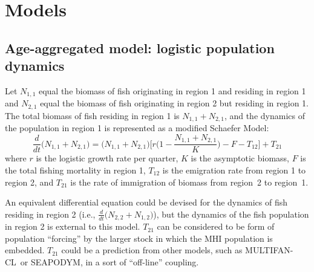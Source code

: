 \documentclass[12pt,letterpaper,twoside]{article}
\newcommand\SD{SEAPODYM}
\newcommand\MFCL{MULTIFAN-CL}
\newcommand\help[1]{\color{Magenta}{\it #1 }\normalcolor}
\newcommand\None{{N_{1,1}}}
\newcommand\Ntwo{{N_{2,1}}}
\newcommand\Nsum{{N_{1,1}+N_{2,1}}}
\begin{document}



\section{Models}
\label{sec:models}
\subsection*{Age-aggregated model: logistic population dynamics}

Let $\None$ equal the biomass of fish originating in region 1
and residing in region 1
and $\Ntwo$ equal the biomass of fish originating in region 2
but residing in region 1.
The total biomass of fish residing in region 1 is
$\Nsum$, and the dynamics of the population in region 1 is represented
as a modified Schaefer Model:
\begin{equation}
\frac{d}{dt}\big(\Nsum\big)=\big(\Nsum\big)\Big[r\Big(1-\frac{\Nsum}{K}\Big)-F-T_{12}\Big]+T_{21}
\label{eqn:logistic}
\end{equation}
where $r$ is the logistic growth rate per quarter, $K$ is the
asymptotic biomass,
$F$ is the total fishing mortality in region 1, $T_{12}$
is the emigration rate from region 1 to region 2, and $T_{21}$
is the rate of immigration of biomass from region~2 to region~1.


An equivalent differential equation could be devised for the dynamics of
fish residing in region 2 
(i.e., $\frac{d}{dt}\big(N_{2,2}+N_{1,2}\big)$), but 
the dynamics of the fish population in region 2 is external to this
model. $T_{21}$ can be considered to be form of population ``forcing''
by the larger stock in which the MHI population is embedded. $T_{21}$
could be a prediction from other models, such as \MFCL\ or \SD, 
in a sort of ``off-line'' coupling.
\end{document}
